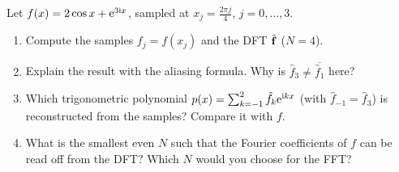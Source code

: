 Let $f(x)=2\cos x+\mathrm{e}^{3\mathrm{i} x}$, sampled at $x_j=\frac{2\pi j}4$, $j=0,\dots,3$.
\begin{enumerate}
\item Compute the samples $f_j=f(x_j)$ and the DFT $\hat{\mathbf{f}}$ ($N=4$).
\item Explain the result with the aliasing formula. Why is $\hat f_3\neq\overline{\hat f_1}$ here?
\item Which trigonometric polynomial $p(x)=\sum_{k=-1}^{2}\hat f_k\mathrm{e}^{\mathrm{i} kx}$ (with $\hat f_{-1}=\hat f_3$) is reconstructed from the samples? Compare it with $f$.
\item What is the smallest even $N$ such that the Fourier coefficients of $f$ can be read off from the DFT? Which $N$ would you choose for the FFT?
\end{enumerate}

